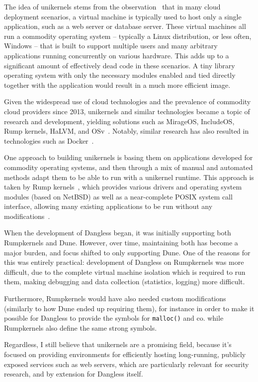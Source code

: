 The idea of unikernels stems from the observation~\cite{unikernels-intro} that in many cloud deployment scenarios, a virtual machine is typically used to host only a single application, such as a web server or database server. These virtual machines all run a commodity operating system -- typically a Linux distribution, or less often, Windows -- that is built to support multiple users and many arbitrary applications running concurrently on various hardware. This adds up to a significant amount of effectively dead code in these scenarios.
A tiny library operating system with only the necessary modules enabled and tied directly together with the application would result in a much more efficient image.

Given the widespread use of cloud technologies and the prevalence of commodity cloud providers since 2013, unikernels and similar technologies became a topic of research and development, yielding solutions such as MirageOS, IncludeOS, Rump kernels, HaLVM, and OSv~\cite{unikernels-list}. Notably, similar research has also resulted in technologies such as Docker~\cite{docker-web}.

One approach to building unikernels is basing them on applications developed for commodity operating systems, and then through a mix of manual and automated methods adapt them to be able to run with a unikernel runtime. This approach is taken by Rump kernels~\cite{rumpkernels-web}, which provides various drivers and operating system modules (based on NetBSD) as well as a near-complete POSIX system call interface, allowing many existing applications to be run without any modifications~\cite{rumpkernels-doc}.

When the development of Dangless began, it was initially supporting both Rumpkernels and Dune. However, over time, maintaining both has become a major burden, and focus shifted to only supporting Dune. One of the reasons for this was entirely practical: development of Dangless on Rumpkernels was more difficult, due to the complete virtual machine isolation which is required to run them, making debugging and data collection (statistics, logging) more difficult.

Furthermore, Rumpkernels would have also needed custom modifications (similarly to how Dune ended up requiring them), for instance in order to make it possible for Dangless to provide the symbols for \lstinline!malloc()! and co. while Rumpkernels also define the same strong symbols.

Regardless, I still believe that unikernels are a promising field, because it's focused on providing environments for efficiently hosting long-running, publicly exposed services such as web servers, which are particularly relevant for security research, and by extension for Dangless itself.

